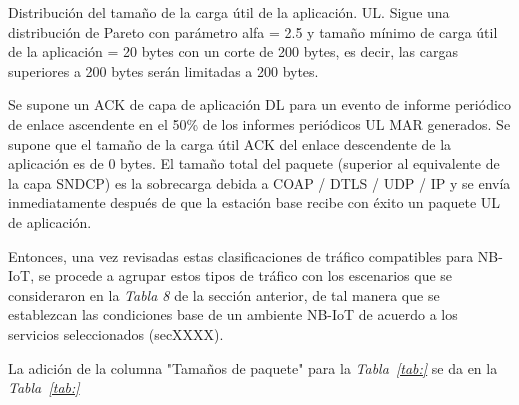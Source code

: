Distribución del tamaño de la carga útil de la aplicación. UL. Sigue una distribución de Pareto con parámetro alfa = 2.5 y tamaño mínimo de carga útil de la aplicación = 20 bytes con un corte de 200 bytes, es decir, las cargas superiores a 200 bytes serán limitadas a 200 bytes.\newline

Se supone un ACK de capa de aplicación DL para un evento de informe periódico de enlace ascendente en el 50\% de los informes periódicos UL MAR generados. Se supone que el tamaño de la carga útil ACK del enlace descendente de la aplicación es de 0 bytes. El tamaño total del paquete (superior al equivalente de la capa SNDCP) es la sobrecarga debida a COAP / DTLS / UDP / IP y se envía inmediatamente después de que la estación base recibe con éxito un paquete UL de aplicación.\newline

Entonces, una vez revisadas estas clasificaciones de tráfico compatibles para NB-IoT, se procede a agrupar estos tipos de tráfico con los escenarios que se consideraron en la \textit{Tabla 8} de la sección anterior, de tal manera que se establezcan las condiciones base de un ambiente NB-IoT de acuerdo a los servicios seleccionados (secXXXX).\newline

La adición de la columna "Tamaños de paquete" para la \textit{Tabla~\ref{tab:}} se da en la \textit{Tabla~\ref{tab:}}\newline


